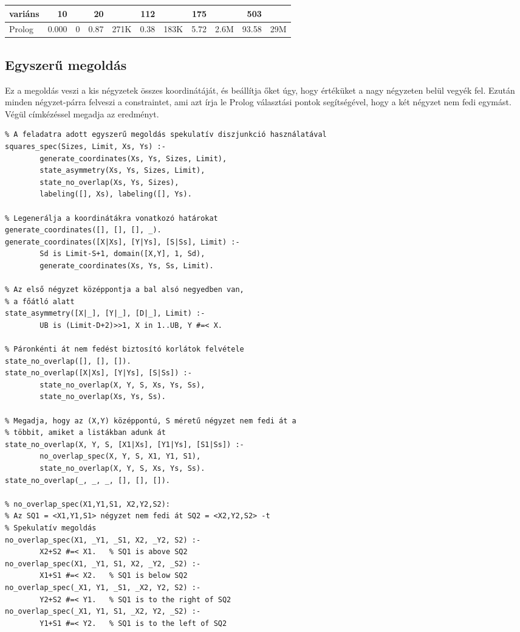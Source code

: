 \begin{center}
\begin{tabular}{|l|rr|rr|rr|rr|rr|}
\hline
variáns   & 10     &      &  20   &      & 112    &      & 175   &    & 503  &\\
\hline
Prolog          &  0.000 &     0&  0.87& 271K &  0.38 &  183K & 5.72 & 2.6M
&93.58 & 29M \\
\hline
\end{tabular}
\end{center}

\subsection{Egyszerű \clpfd megoldás}

Ez a megoldás veszi a kis négyzetek összes koordinátáját, és beállítja
őket úgy, hogy értéküket a nagy négyzeten belül vegyék fel. Ezután
minden négyzet-párra felveszi a  constraintet,
ami azt írja le Prolog választási pontok segítségével, hogy a két
négyzet nem fedi egymást. Végül címkézéssel megadja az eredményt.

\begin{verbatim}
% A feladatra adott egyszerű megoldás spekulatív diszjunkció használatával
squares_spec(Sizes, Limit, Xs, Ys) :-
        generate_coordinates(Xs, Ys, Sizes, Limit),
        state_asymmetry(Xs, Ys, Sizes, Limit),
        state_no_overlap(Xs, Ys, Sizes),
        labeling([], Xs), labeling([], Ys).

% Legenerálja a koordinátákra vonatkozó határokat
generate_coordinates([], [], [], _).
generate_coordinates([X|Xs], [Y|Ys], [S|Ss], Limit) :-
        Sd is Limit-S+1, domain([X,Y], 1, Sd),
        generate_coordinates(Xs, Ys, Ss, Limit).

% Az első négyzet középpontja a bal alsó negyedben van,
% a főátló alatt
state_asymmetry([X|_], [Y|_], [D|_], Limit) :-
        UB is (Limit-D+2)>>1, X in 1..UB, Y #=< X.

% Páronkénti át nem fedést biztosító korlátok felvétele
state_no_overlap([], [], []).
state_no_overlap([X|Xs], [Y|Ys], [S|Ss]) :-
        state_no_overlap(X, Y, S, Xs, Ys, Ss),
        state_no_overlap(Xs, Ys, Ss).

% Megadja, hogy az (X,Y) középpontú, S méretű négyzet nem fedi át a
% többit, amiket a listákban adunk át
state_no_overlap(X, Y, S, [X1|Xs], [Y1|Ys], [S1|Ss]) :-
        no_overlap_spec(X, Y, S, X1, Y1, S1),
        state_no_overlap(X, Y, S, Xs, Ys, Ss).
state_no_overlap(_, _, _, [], [], []).

% no_overlap_spec(X1,Y1,S1, X2,Y2,S2): 
% Az SQ1 = <X1,Y1,S1> négyzet nem fedi át SQ2 = <X2,Y2,S2> -t
% Spekulatív megoldás
no_overlap_spec(X1, _Y1, _S1, X2, _Y2, S2) :-   
        X2+S2 #=< X1.   % SQ1 is above SQ2
no_overlap_spec(X1, _Y1, S1, X2, _Y2, _S2) :- 
        X1+S1 #=< X2.   % SQ1 is below SQ2
no_overlap_spec(_X1, Y1, _S1, _X2, Y2, S2) :-
        Y2+S2 #=< Y1.   % SQ1 is to the right of SQ2
no_overlap_spec(_X1, Y1, S1, _X2, Y2, _S2) :-   
        Y1+S1 #=< Y2.   % SQ1 is to the left of SQ2
\end{verbatim}

